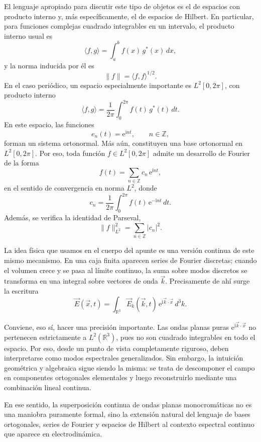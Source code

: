\documentclass[12pt,a4paper]{article}
\theoremstyle{definition}
\theoremstyle{plain}
\numberwithin{equation}{section}
\theoremstyle{remark}
\newcommand{\ii}{\mathrm{i}}
\newcommand{\ee}{\mathrm{e}}
\begin{document}
El lenguaje apropiado para discutir este tipo de objetos es el de espacios con producto interno y, más específicamente, el de espacios de Hilbert. En particular, para funciones complejas cuadrado integrables en un intervalo, el producto interno usual es
\begin{equation*}
    \langle f,g\rangle=\int_a^b f(x)\,g^*(x)\,dx,
\end{equation*}
y la norma inducida por él es
\begin{equation*}
    \|f\|=\langle f,f\rangle^{1/2}.
\end{equation*}
En el caso periódico, un espacio especialmente importante es $L^2[0,2\pi]$, con producto interno
\begin{equation*}
    \langle f,g\rangle=\frac{1}{2\pi}\int_0^{2\pi} f(t)\,g^*(t)\,dt.
\end{equation*}
En este espacio, las funciones
\begin{equation*}
    e_n(t)=\ee^{\ii nt},\qquad n\in\mathbb Z,
\end{equation*}
forman un sistema ortonormal. Más aún, constituyen una base ortonormal en $L^2[0,2\pi]$. Por eso, toda función $f\in L^2[0,2\pi]$ admite un desarrollo de Fourier de la forma
\begin{equation*}
    f(t)=\sum_{n\in\mathbb Z} c_n\,\ee^{\ii nt},
\end{equation*}
en el sentido de convergencia en norma $L^2$, donde
\begin{equation*}
    c_n=\frac{1}{2\pi}\int_0^{2\pi} f(t)\,\ee^{-\ii nt}\,dt.
\end{equation*}
Además, se verifica la identidad de Parseval,
\begin{equation*}
    \|f\|_{L^2}^2=\sum_{n\in\mathbb Z}|c_n|^2.
\end{equation*}

La idea física que usamos en el cuerpo del apunte es una versión continua de este mismo mecanismo. En una caja finita aparecen series de Fourier discretas; cuando el volumen crece y se pasa al límite continuo, la suma sobre modos discretos se transforma en una integral sobre vectores de onda $\vec k$. Precisamente de ahí surge la escritura
\begin{equation*}
    \vec E(\vec x,t)=\int_{\mathbb R^3}\vec E_k(\vec k,t)\,\ee^{\ii\vec k\cdot\vec x}\,d^3k.
\end{equation*}

Conviene, eso sí, hacer una precisión importante. Las ondas planas puras $\ee^{\ii\vec k\cdot\vec x}$ no pertenecen estrictamente a $L^2(\mathbb R^3)$, pues no son cuadrado integrables en todo el espacio. Por eso, desde un punto de vista completamente riguroso, deben interpretarse como modos espectrales generalizados. Sin embargo, la intuición geométrica y algebraica sigue siendo la misma: se trata de descomponer el campo en componentes ortogonales elementales y luego reconstruirlo mediante una combinación lineal continua.

En ese sentido, la superposición continua de ondas planas monocromáticas no es una maniobra puramente formal, sino la extensión natural del lenguaje de bases ortogonales, series de Fourier y espacios de Hilbert al contexto espectral continuo que aparece en electrodinámica.
\end{document}
